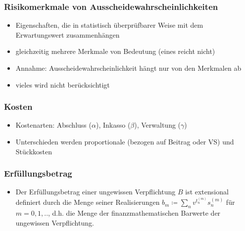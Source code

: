 \documentclass[12pt]{report}
\theoremstyle{dotless}
\theoremstyle{definition}
\begin{document}
\subsubsection{Risikomerkmale von Ausscheidewahrscheinlichkeiten}
\begin{itemize}
	\item Eigenschaften, die in statistisch überprüfbarer Weise mit dem Erwartungswert zusammenhängen
	\item gleichzeitig mehrere Merkmale von Bedeutung (eines reicht nicht)
	\item Annahme: Ausscheidewahrscheinlichkeit hängt nur von den Merkmalen ab
	\item vieles wird nicht berücksichtigt
\end{itemize}

\subsubsection{Kosten}
\begin{itemize}
	\item Kostenarten: Abschluss ($\alpha$), Inkasso ($\beta$), Verwaltung ($\gamma$)
	\item Unterschieden werden proportionale (bezogen auf Beitrag oder VS) und Stückkosten
\end{itemize}

\subsubsection{Erfüllungsbetrag}
\begin{itemize}
	\item Der Erfüllungsbetrag einer ungewissen Verpflichtung $B$ ist extensional definiert durch die Menge seiner Realisierungen $b_m \coloneqq \sum_n v^{t_n^{(m)}}s_n^{(m)}$ für $m=0,1,..$, d.h. die Menge der finanzmathematischen Barwerte der ungewissen Verpflichtung.
\end{itemize}
\end{document}
